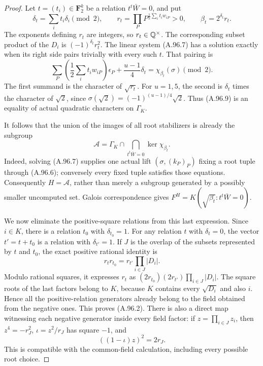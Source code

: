 \begin{proof}
Let $t=(t_i)\in\mathbf F_2^k$ be a relation
$t^t\bar W=0$, and put
\[
 \delta_t=\sum_i t_i\delta_i\pmod2,\qquad
 r_t=\prod_P P^{\frac12\sum_i t_iw_{iP}}>0,\qquad
 \beta_t=2^{\delta_t}r_t.
 \tag{A.96.8}
\]
The exponents defining $r_t$ are integers, so $r_t\in\mathbb Q^\times$.
The corresponding subset product of the $D_i$ is
$(-1)^{\delta_t}r_t^2$.
The linear system (A.96.7) has a solution exactly when its
right side pairs trivially with every such $t$.
That pairing is
\[
       \sum_P\left(\frac12\sum_i t_iw_{iP}\right)\epsilon_P
                  +\frac{u-1}{4}\delta_t
                        =\chi_{\beta_t}(\sigma)\pmod2.
 \tag{A.96.9}
\]
The first summand is the character of $\sqrt{r_t}$.
For $u=1,5$, the second is $\delta_t$ times the character
of $\sqrt2$, since
$\sigma(\sqrt2)=(-1)^{(u-1)/4}\sqrt2$.
Thus (A.96.9) is an equality of actual quadratic characters
on $\Gamma_K$.

It follows that the union of the images of all root
stabilizers is already the subgroup
\[
 \mathcal A
     =\Gamma_K\cap\bigcap_{t^t\bar W=0}\ker\chi_{\beta_t}.
 \tag{A.96.10}
\]
Indeed, solving (A.96.7) supplies one actual lift
$(\sigma,(k_P)_P)$ fixing a root tuple through (A.96.6);
conversely every fixed tuple satisfies those equations.
Consequently $H=\mathcal A$, rather than merely a
subgroup generated by a possibly smaller uncomputed set.
Galois correspondence gives
$F^H=K(\sqrt{\beta_t}:t^t\bar W=0)$.

We now eliminate the positive-square relations from this
last expression.
Since $i\in K$, there is a relation $t_0$ with
$\delta_{t_0}=1$.
For any relation $t$ with $\delta_t=0$, the vector
$t'=t+t_0$ is a relation with $\delta_{t'}=1$.
If $J$ is the overlap of the subsets represented by
$t$ and $t_0$, the exact positive rational identity is
\[
             r_t r_{t_0}
                    =r_{t'}\prod_{i\in J}|D_i|.
 \tag{A.96.11}
\]
Modulo rational squares, it expresses $r_t$ as
$(2r_{t_0})(2r_{t'})\prod_{i\in J}|D_i|$.
The square roots of the last factors belong to $K$,
because $K$ contains every $\sqrt{D_i}$ and also $i$.
Hence all the positive-relation generators already
belong to the field obtained from the negative ones.
This proves (A.96.2).
There is also a direct map witnessing each negative
generator inside every field factor: if
$z=\prod_{i\in J}z_i$, then $z^4=-r_J^2$,
$\iota=z^2/r_J$ has square $-1$, and
\[
                         ((1-\iota)z)^2=2r_J.
 \tag{A.96.12}
\]
This is compatible with the common-field calculation,
including every possible root choice.


\end{proof}
